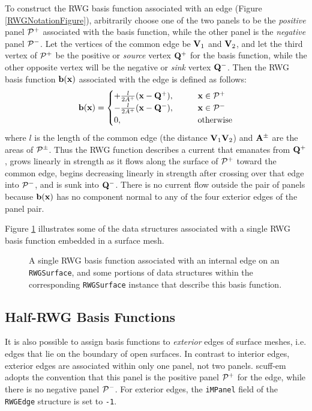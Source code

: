 To construct the RWG basis function associated with an 
edge (Figure \ref{RWGNotationFigure}), arbitrarily choose one 
of the two panels to be the \textit{positive} panel $\mathcal{P}^+$ 
associated with the basis function, while the other panel is the 
\textit{negative} panel $\mathcal{P}^-$. Let the vertices of the 
common edge be $\mathbf{V}_1$ and $\mathbf{V}_2$, and let the third vertex of 
$\mathcal{P}^+$ be the positive or \textit{source} vertex 
$\mathbf{Q}^+$ for the basis function, 
while the other opposite vertex will be the 
negative or \textit{sink} vertex $\mathbf{Q}^-$. Then 
the RWG basis function $\mathbf{b}(\mathbf{x})$ associated with the
edge is defined as follows:
$$ \mathbf{b}(\mathbf{x}) = 
   \begin{cases}   
  +\frac{l}{2A^+}(\mathbf{x} - \mathbf{Q}^+), \qquad &\mathbf{x} \in \mathcal{P}^+ \\ 
  -\frac{l}{2A^+}(\mathbf{x} - \mathbf{Q}^-), \qquad &\mathbf{x} \in \mathcal{P}^- \\ 
   0, \qquad &\text{otherwise}
   \end{cases}
$$
where $l$ is the length of the common edge (the distance
$\mathbf{V}_1 \mathbf{V}_2$) and $\mathbf{A}^\pm$ are the areas of $\mathcal{P}^\pm$.
Thus the RWG function describes a current that emanates 
from $\mathbf{Q}^+$, grows linearly in strength as it flows along
the surface of $\mathcal{P}^+$ toward the common edge, begins
decreasing linearly in strength after crossing over that
edge into $\mathcal{P}^-$, and is sunk into $\mathbf{Q}^-$. There
is no current flow outside the pair of panels because
$\mathbf{b}(\mathbf{x})$ has no component normal to any of the 
four exterior edges of the panel pair.

Figure \ref{RWGBasisFunctionFigure} illustrates some of the 
\lss data structures associated with a single RWG basis function
embedded in a surface mesh.
\begin{figure}
\begin{center}
\caption{A single RWG basis function associated with an internal edge 
         on an \texttt{RWGSurface}, and some portions of data structures 
         within the corresponding \texttt{RWGSurface} instance that 
         describe this basis function.}
\label{RWGBasisFunctionFigure}
\end{center}
\end{figure}

\subsection*{Half-RWG Basis Functions}

It is also possible to assign basis functions to 
\textit{exterior} edges of surface meshes, i.e.
edges that lie on the boundary of open surfaces.
In contrast to interior edges, exterior edges 
are associated within only one panel, not two
panels. {\sc scuff-em} adopts the convention
that this panel is the positive panel $\mathcal{P}^+$
for the edge, while there is no negative panel
$\mathcal{P}^-$. For exterior edges, the \texttt{iMPanel}
field of the \texttt{RWGEdge} structure 
is set to \texttt{-1}.


